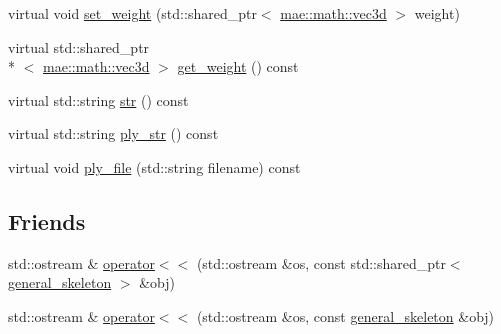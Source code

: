 \begin{DoxyCompactItemize}
\item 
virtual void \hyperlink{classmae_1_1general__skeleton_a7f13169da11fac4094b2f829a1c4bd41}{set\-\_\-weight} (std\-::shared\-\_\-ptr$<$ \hyperlink{classmae_1_1math_1_1vec3d}{mae\-::math\-::vec3d} $>$ weight)
\item 
virtual std\-::shared\-\_\-ptr\\*
$<$ \hyperlink{classmae_1_1math_1_1vec3d}{mae\-::math\-::vec3d} $>$ \hyperlink{classmae_1_1general__skeleton_a39ee9e8e865a3d6c4046eb9dd9871e02}{get\-\_\-weight} () const 
\item 
virtual std\-::string \hyperlink{classmae_1_1general__skeleton_a583f49cd26231afbaf9e45decd593f11}{str} () const 
\item 
virtual std\-::string \hyperlink{classmae_1_1general__skeleton_af5305876af2f48217dab7c1e3efc1446}{ply\-\_\-str} () const 
\item 
virtual void \hyperlink{classmae_1_1general__skeleton_a3df84cb9d71969f1a365da48dbebd51f}{ply\-\_\-file} (std\-::string filename) const 
\end{DoxyCompactItemize}
\subsection*{Friends}
\begin{DoxyCompactItemize}
\item 
std\-::ostream \& \hyperlink{classmae_1_1general__skeleton_a05ac4e64849d3f39d1d7613d2b93ccf9}{operator$<$$<$} (std\-::ostream \&os, const std\-::shared\-\_\-ptr$<$ \hyperlink{classmae_1_1general__skeleton}{general\-\_\-skeleton} $>$ \&obj)
\item 
std\-::ostream \& \hyperlink{classmae_1_1general__skeleton_a521f80ff2c6d04d0e8b08e03b7e0a31d}{operator$<$$<$} (std\-::ostream \&os, const \hyperlink{classmae_1_1general__skeleton}{general\-\_\-skeleton} \&obj)
\end{DoxyCompactItemize}


